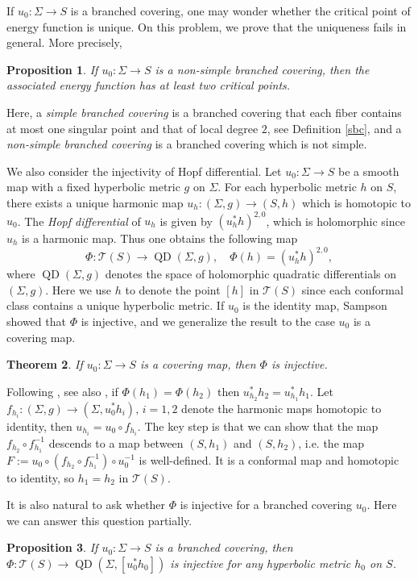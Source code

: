 \documentclass[11pt]{amsart}
\numberwithin{equation}{section}
\def\mc{\mathcal}
\theoremstyle{plain}
\newtheorem{thm}{Theorem}[section]
\newtheorem{prop}[thm]{Proposition}
\theoremstyle{definition}
\theoremstyle{definition}
\def\op{\operatorname}
\begin{document}
If $u_0:\Sigma\to S$ is a branched covering, one may wonder whether the critical point of energy function is unique. On this problem, we prove that the uniqueness fails in general. More precisely,
\begin{prop}\label{prop2}
If $u_0:\Sigma\to S$ is a non-simple branched covering, then the associated energy function has at least two critical points.
\end{prop}
Here, a {\it simple branched covering} is a branched covering that each fiber contains at most one singular point and that of  local degree $2$, see Definition \ref{sbc}, and a {\it non-simple branched covering} is a branched covering which is not simple. 

We also consider the injectivity of Hopf differential. Let $u_0:\Sigma\to S$ be a smooth map with a fixed  hyperbolic metric $g$ on $\Sigma$.  For each hyperbolic metric $h$ on $S$, there exists a unique harmonic map $u_h:(\Sigma,g)\to (S,h)$ which is homotopic to $u_0$. The {\it Hopf differential} of $u_h$ is given by $(u_h^*h)^{2,0}$, which is holomorphic since $u_h$ is a harmonic map. Thus one obtains the following map 
$$\Phi:\mc{T}(S)\to \op{QD}(\Sigma,g), \quad \Phi(h)=(u^*_hh)^{2,0},$$ 
where $\operatorname{QD}(\Sigma,g)$ denotes the space of holomorphic quadratic differentials on $(\Sigma,g)$. Here we use $h$ to denote the point $[h]$ in $\mc{T}(S)$ since each conformal class contains a unique hyperbolic metric. If $u_0$ is the identity map, Sampson \cite{Sampson} showed that $\Phi$ is injective, and we generalize the result to the case $u_0$ is a covering map. 
\begin{thm}\label{thm3}
If $u_0:\Sigma\to S$ is a covering map, then $\Phi$ is injective. 	
\end{thm}
Following \cite{Sampson}, see also \cite{Wolf0}, if $\Phi(h_1)=\Phi(h_2)$ then $u_{h_2}^*h_2=u_{h_1}^*h_1$. Let $f_{h_i}:(\Sigma,g)\to (\Sigma,u_0^*h_i),\, i=1,2$ denote the harmonic maps homotopic to identity, then $u_{h_i}=u_0\circ f_{h_i}$. The key step is that we can show that the map $f_{h_2}\circ f_{h_1}^{-1}$ descends to a map between $(S,h_1)$ and $(S,h_2)$, i.e. the map $F:=u_0\circ (f_{h_2}\circ f_{h_1}^{-1})\circ u_0^{-1}$ is well-defined. It is a conformal map and homotopic to identity, so $h_1=h_2$ in $\mc{T}(S)$. 

It is also natural to ask whether $\Phi$ is injective for  a branched covering $u_0$. Here we can answer this question partially. 
\begin{prop}\label{prop3}
	If $u_0:\Sigma\to S$ is a branched covering, then $\Phi:\mc{T}(S)\to \op{QD}(\Sigma,[u_0^*h_0])$ is injective for any hyperbolic metric $h_0$ on $S$.
\end{prop}
\end{document}
